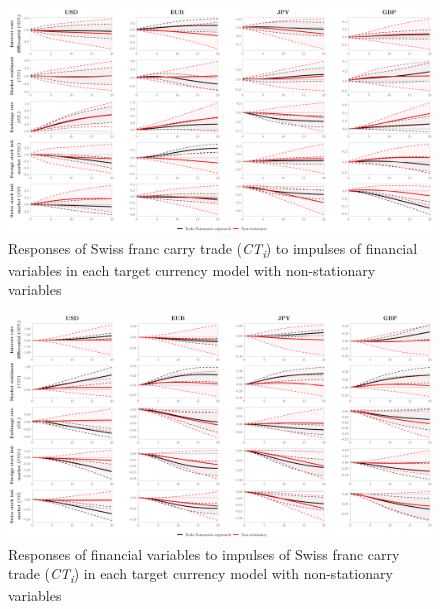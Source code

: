 \documentclass[a4paper, twoside]{templates/ociamthesis}
\begin{document}
\begin{figure}[!ht]

{\centering \includegraphics[width=0.99\columnwidth]{figure/gALL_COIRF20_RESP20_NTYA} 

}

\caption{Responses of Swiss franc carry trade (\textit{CT\textsubscript{i}}) to impulses of financial variables in each target currency model with non-stationary variables}\label{fig:FigureD3}
\end{figure}

\begin{figure}[!ht]

{\centering \includegraphics[width=0.99\columnwidth]{figure/gALL_COIRF20_NTYA} 

}

\caption{Responses of financial variables to impulses of Swiss franc carry trade (\textit{CT\textsubscript{i}}) in each target currency model with non-stationary variables}\label{fig:FigureD4}
\end{figure}

\clearpage
\end{document}
